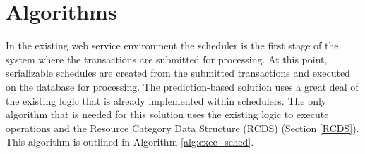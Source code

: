 \documentclass[conference]{IEEEtran}
\begin{document}

\section{Algorithms}
\label{sec:algorithms}
In the existing web service environment the scheduler is the first stage of the system where the transactions are submitted for processing. At this point, serializable schedules are created from the submitted transactions and executed on the database for processing. The prediction-based solution uses a great deal of the existing logic that is already implemented within schedulers. The only algorithm that is needed for this solution uses the existing logic to execute operations and the Resource Category Data Structure (RCDS) (Section \ref{RCDS}). This algorithm is outlined in Algorithm \ref{alg:exec_sched}.

\end{document}
